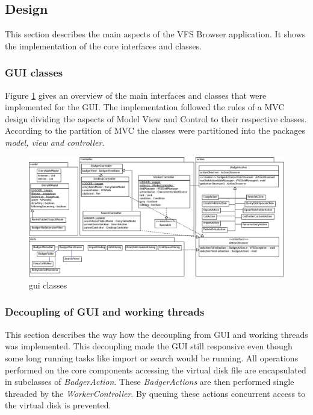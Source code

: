 \subsection{Design}
This section describes the main aspects of the VFS Browser application. It shows
the implementation of the core interfaces and classes.

\subsubsection{GUI classes}\label{sec:guiClasses}
Figure \ref{fig:gui_classes} gives an overview of the main interfaces and
classes that were implemented for the GUI. The implementation followed the rules
of a MVC design dividing the aspects of Model View and Control to their
respective classes. According to the partition of MVC the classes were
partitioned into the packages \textit{model, view and controller}.

\begin{figure}[h!]
\centering
\includegraphics[width=1\textwidth]{figures/gui_classes.eps}
\caption{gui classes}
\label{fig:gui_classes}
\end{figure}


\subsubsection{Decoupling of GUI and working threads}
This section describes the way how the decoupling from GUI and working threads
was implemented. This decoupling made the GUI still responsive even though some
long running tasks like import or search would be running. All operations performed on the core components accessing the virtual disk file are encapsulated in subclasses of \textit{BadgerAction}. These \textit{BadgerActions} are then performed single threaded by the \textit{WorkerController}. By queuing these actions concurrent access to the virtual disk is prevented.

